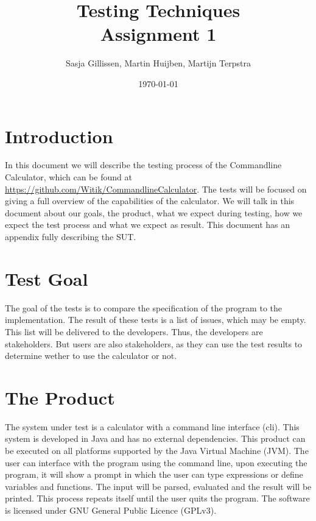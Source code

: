 \documentclass[11pt,a4paper]{article}
\author{Sasja Gillissen, Martin Huijben, Martijn Terpstra}
\date{\today}
\title{Testing Techniques\\
  \textbf{Assignment 1}}
\begin{document}
\maketitle

\section{Introduction}
In this document we will describe the testing process of the
Commandline Calculator, which can be found at
\url{https://github.com/Witik/CommandlineCalculator}. The tests will
be focused on giving a full overview of the capabilities of the
calculator. We will talk in this document about our goals, the
product, what we expect during testing, how we expect the test process
and what we expect as result. This document has an appendix fully
describing the SUT.

\section{Test Goal}
The goal of the tests is to compare the specification of the program to the implementation. The result of these tests is a list of issues, which may be empty. This list will be delivered to the developers. Thus, the developers are stakeholders. But users are also stakeholders, as they can use the test results to determine wether to use the calculator or not.


\section{The Product}
The system under test is a calculator with a command line interface (cli). This system is developed in Java and has no external dependencies. This product can be executed on all platforms supported by the Java Virtual Machine (JVM). The user can interface with the program using the command line, upon executing the program, it will show a prompt in which the user can type expressions or define variables and functions. The input will be parsed, evaluated and the result will be printed. This process repeats itself until the user quits the program. The software is licensed under GNU General Public Licence (GPLv3).
\end{document}
